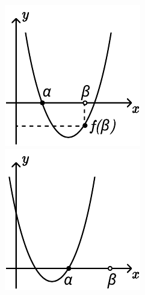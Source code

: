 \begin {figure} [h]
    \begin {minipage} [t] {0.3\linewidth}
        \centering
        \includegraphics [width=\linewidth] {image/image_03.pdf}
    \end {minipage}
    \hfill
    \begin {minipage} [t] {0.3\linewidth}
        \centering
        \includegraphics [width=\linewidth] {image/image_17.pdf}

\end{minipage}
\end{figure}
